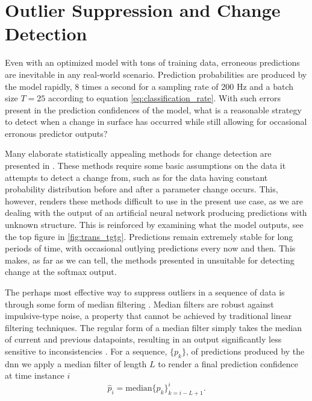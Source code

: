 \section{Outlier Suppression and Change Detection}

\label{surface_change}
Even with an optimized model with tons of training data, erroneous predictions are inevitable in any real-world scenario. Prediction probabilities are produced by the model rapidly, 8 times a second for a sampling rate of 200 Hz and a batch size $T=25$ according to equation \eqref{eq:classification_rate}. With such errors present in the prediction confidences of the model, what is a reasonable strategy to detect when a change in surface has occurred while still allowing for occasional erronous predictor outputs?  

Many elaborate statistically appealing methods for change detection are presented in \citep{basseville_nikiforov_1993}. These methods require some basic assumptions on the data it attempts to detect a change from, such as for the data having constant probability distribution before and after a parameter change occurs. This, however, renders these methods difficult to use in the present use case, as we are dealing with the output of an artificial neural network producing predictions with unknown structure. This is reinforced by examining what the model outputs, see the top figure in \ref{fig:trans_tgtg}. Predictions remain extremely stable for long periods of time, with occasional outlying predictions every now and then. This makes, as far as we can tell, the methods presented in \citep{basseville_nikiforov_1993} unsuitable for detecting change at the softmax output.

The perhaps most effective way to suppress outliers in a sequence of data is through some form of median filtering \citep{yin_yang_gabbouj_neuvo_1996}. Median filters are robust against impulsive-type noise, a property that cannot be achieved by traditional linear filtering techniques. The regular form of a median filter simply takes the median of current and previous datapoints, resulting in an output significantly less sensitive to inconsistencies \citep{pearson_2002}. For a sequence, $\{p_k\}$, of predictions produced by the \gls{dnn} we apply a median filter of length $L$ to render a final prediction confidence at time instance $i$
\citep{yin_yang_gabbouj_neuvo_1996}
\begin{equation}
	\hat{p}_i=\text{median}\{p_k\}_{k=i-L+1}^i.
\end{equation}

